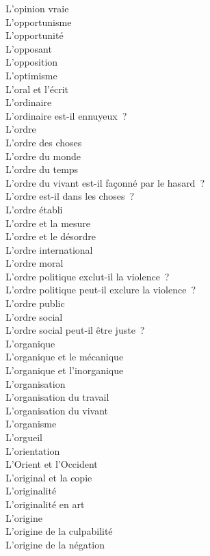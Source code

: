\documentclass[a4paper,12pt]{article}
\begin{document}
L'opinion vraie \\
L'opportunisme \\
L'opportunité \\
L'opposant \\
L'opposition \\
L'optimisme \\
L'oral et l'écrit \\
L'ordinaire \\
L'ordinaire est-il ennuyeux ? \\
L'ordre \\
L'ordre des choses \\
L'ordre du monde \\
L'ordre du temps \\
L'ordre du vivant est-il façonné par le hasard ? \\
L'ordre est-il dans les choses ? \\
L'ordre établi \\
L'ordre et la mesure \\
L'ordre et le désordre \\
L'ordre international \\
L'ordre moral \\
L'ordre politique exclut-il la violence ? \\
L'ordre politique peut-il exclure la violence ? \\
L'ordre public \\
L'ordre social \\
L'ordre social peut-il être juste ? \\
L'organique \\
L'organique et le mécanique \\
L'organique et l'inorganique \\
L'organisation \\
L'organisation du travail \\
L'organisation du vivant \\
L'organisme \\
L'orgueil \\
L'orientation \\
L'Orient et l'Occident \\
L'original et la copie \\
L'originalité \\
L'originalité en art \\
L'origine \\
L'origine de la culpabilité \\
L'origine de la négation \\
\end{document}
